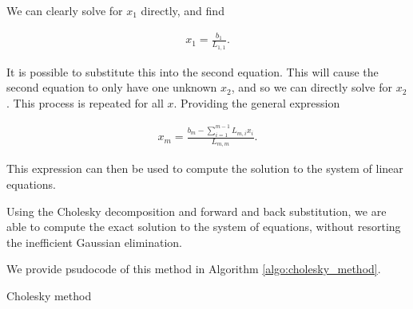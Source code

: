 \documentclass[../fem.tex]{subfiles}
\begin{document}
We can clearly solve for $x_1$ directly, and find

\begin{align*}
  x_1=\frac{b_1}{L_{1,1}}.
\end{align*}

It is possible to substitute this into the second equation. This will cause the
second equation to only have one unknown $x_2$, and so we can directly solve
for $x_2$. This process is repeated for all $x$. Providing the general
expression

\begin{align*}
  x_m=\frac{b_m-\sum_{i=1}^{m-1}L_{m,i}x_i}{L_{m,m}}.
\end{align*}

This expression can then be used to compute the solution to the system of
linear equations.

Using the Cholesky decomposition and forward and back substitution, we are able
to compute the exact solution to the system of equations, without resorting the
inefficient Gaussian elimination.

We provide psudocode of this method in Algorithm \ref{algo:cholesky_method}.

\begin{algorithm}[H]
  \caption{Cholesky method}\label{algo:cholesky_method}
  \begin{algorithmic}
    \State{}
      \EndFor
        \EndFor
      \EndFor
    \EndFor
    \State{}
      \EndFor
    \EndFor
    \State{}
      \EndFor
    \EndFor
  \end{algorithmic}
\end{algorithm}
\end{document}
